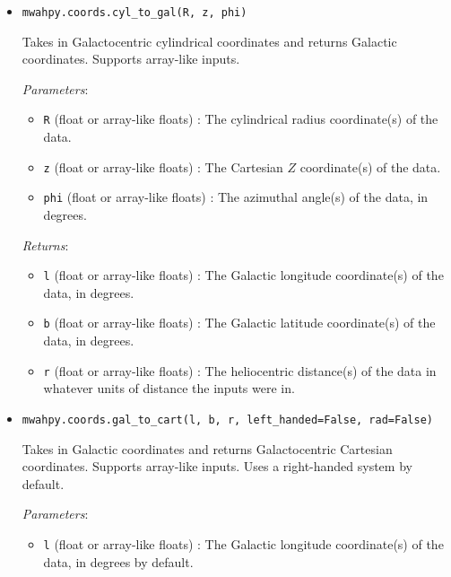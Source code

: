 \documentclass{article}
\begin{document}
\begin{itemize}
\begin{itemize}
\end{itemize}



\item \verb!mwahpy.coords.cyl_to_gal(R, z, phi)!

Takes in Galactocentric cylindrical coordinates and returns Galactic coordinates. Supports array-like inputs.

\textit{Parameters}: \begin{itemize}

\item \verb!R! (float or array-like floats) : The cylindrical radius coordinate(s) of the data.

\item \verb!z! (float or array-like floats) : The Cartesian $Z$ coordinate(s) of the data.

\item \verb!phi! (float or array-like floats) : The azimuthal angle(s) of the data, in degrees.

\end{itemize}

\textit{Returns}: \begin{itemize}

\item \verb!l! (float or array-like floats) : The Galactic longitude coordinate(s) of the data, in degrees.

\item \verb!b! (float or array-like floats) : The Galactic latitude coordinate(s) of the data, in degrees.

\item \verb!r! (float or array-like floats) : The heliocentric distance(s) of the data in whatever units of distance the inputs were in.

\end{itemize}



\item \verb!mwahpy.coords.gal_to_cart(l, b, r, left_handed=False, rad=False)!

Takes in Galactic coordinates and returns Galactocentric Cartesian coordinates. Supports array-like inputs. Uses a right-handed system by default.

\textit{Parameters}: \begin{itemize}

\item \verb!l! (float or array-like floats) : The Galactic longitude coordinate(s) of the data, in degrees by default.


\end{itemize}
\end{itemize}
\end{document}
